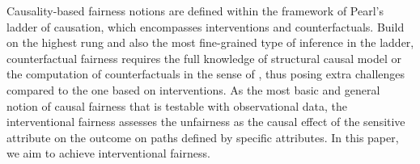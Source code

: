 \documentclass{article} %
\begin{document}
Causality-based fairness notions are defined within the framework of Pearl’s ladder of causation, which encompasses interventions and counterfactuals. Build on the highest rung and also the most fine-grained type of inference in the ladder, counterfactual fairness \citep{kusner2017counterfactual, chiappa2019path, russell2017worlds, wu2019counterfactual} requires the full knowledge of structural causal model or the computation of counterfactuals in the sense of \citet{pearl2000models}, thus posing extra challenges compared to the one based on interventions. 
As the most basic and general notion of causal fairness that is testable with observational data, the interventional fairness assesses the unfairness as the causal effect of the sensitive attribute on the outcome on paths defined by specific attributes. In this paper, we aim to achieve interventional fairness.
\end{document}
